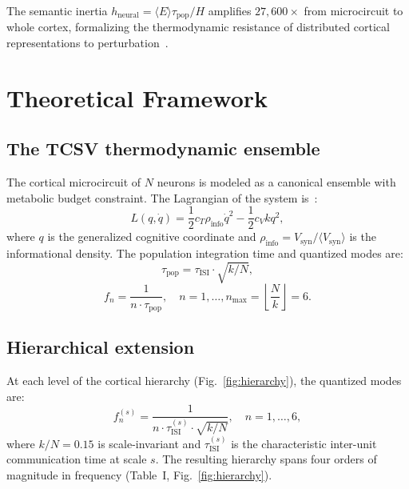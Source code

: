 \documentclass[aps,pre,twocolumn,showpacs,superscriptaddress,longbibliography]{revtex4-2}
\newcommand{\kN}{k/N}
\newcommand{\taupop}{\tau_{\mathrm{pop}}}
\newcommand{\tauISI}{\tau_{\mathrm{ISI}}}
\newcommand{\hneu}{h_{\mathrm{neural}}}
\newcommand{\rhoinfo}{\rho_{\mathrm{info}}}
\begin{document}
The semantic inertia $\hneu = \langle E \rangle \taupop / H$
amplifies $27{,}600\times$ from microcircuit to whole cortex,
formalizing the thermodynamic resistance of distributed cortical
representations to perturbation~\cite{McClelland1995}.

\section{\label{sec:theory}Theoretical Framework}

\subsection{The TCSV thermodynamic ensemble}

The cortical microcircuit of $N$ neurons is modeled as a
canonical ensemble with metabolic budget constraint.
The Lagrangian of the system is~\cite{Santos2025a}:
\begin{equation}
  L(q,\dot{q}) = \frac{1}{2}c_T\rhoinfo\dot{q}^2
               - \frac{1}{2}c_V k q^2,
  \label{eq:lagrangian}
\end{equation}
where $q$ is the generalized cognitive coordinate and
$\rhoinfo = V_{\mathrm{syn}}/\langle V_{\mathrm{syn}}\rangle$
is the informational density.
The population integration time and quantized modes are:
\begin{equation}
  \taupop = \tauISI \cdot \sqrt{\kN},
  \label{eq:taupop}
\end{equation}
\begin{equation}
  f_n = \frac{1}{n \cdot \taupop}, \quad n = 1,\ldots,
  n_{\max} = \left\lfloor \frac{N}{k} \right\rfloor = 6.
  \label{eq:modes}
\end{equation}

\subsection{Hierarchical extension}

At each level of the cortical hierarchy (Fig.~\ref{fig:hierarchy}),
the quantized modes are:
\begin{equation}
  f_n^{(s)} = \frac{1}{n \cdot \tauISI^{(s)} \cdot \sqrt{\kN}},
  \quad n = 1,\ldots,6,
  \label{eq:modes_scaled}
\end{equation}
where $\kN = 0.15$ is scale-invariant and $\tauISI^{(s)}$ is
the characteristic inter-unit communication time at scale $s$.
The resulting hierarchy spans four orders of magnitude in
frequency (Table~I, Fig.~\ref{fig:hierarchy}).
\end{document}
